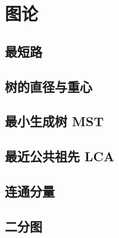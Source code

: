 \section{图论}

\subsection{最短路}

\subsection{树的直径与重心}

\subsection{最小生成树 MST}

\subsection{最近公共祖先 LCA}

\subsection{连通分量}

\subsection{二分图}
